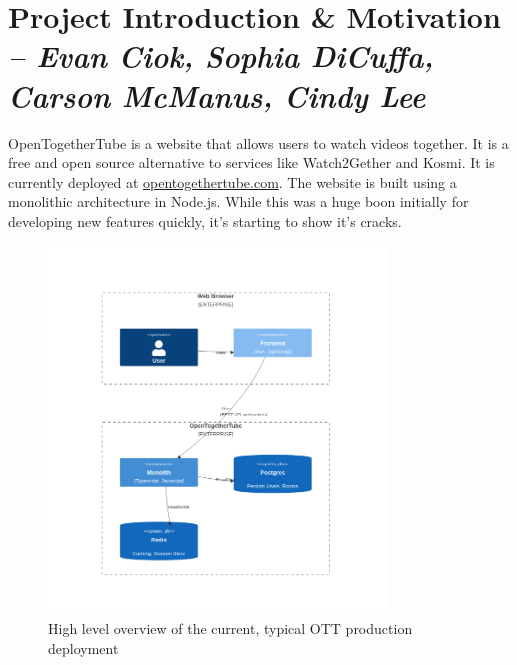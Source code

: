 \chapter{Project Introduction \& Motivation \\
  \small{\textit{-- Evan Ciok, Sophia DiCuffa, Carson McManus, Cindy Lee}}
  \label{Chapter::Motivation}}

OpenTogetherTube is a website that allows users to watch videos together. It is a free and open source alternative to services like Watch2Gether and Kosmi. It is currently deployed at \href{https://opentogethertube.com}{opentogethertube.com}. The website is built using a monolithic architecture in Node.js. While this was a huge boon initially for developing new features quickly, it's starting to show it's cracks.

\begin{figure}[!h]
  \centering
  \includegraphics[width=0.8\textwidth]{Figures/deployment-current.png}
  \caption{High level overview of the current, typical OTT production deployment}
  \label{Figure::deployment-current}
\end{figure}

